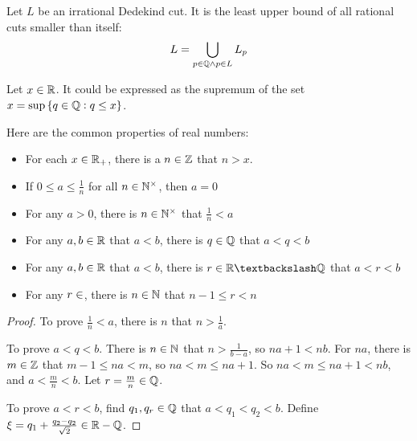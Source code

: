 \begin{theorem}
    Let $L$ be an irrational Dedekind cut. It is the least upper bound of all rational cuts smaller than itself:
    \begin{equation}
        L = \bigcup_{p \in \mathbb{Q} \wedge p \in L} L_p
    \end{equation}    
\end{theorem}


\begin{theorem}
Let $x \in \mathbb{R}$. It could be expressed as the supremum of the set $x = \sup \set{q \in \mathbb{Q}: q \leq x}$.
\end{theorem}



\begin{theorem}
    Here are the common properties of real numbers:
    \begin{itemize}
        \item For each $x \in \mathbb{R}_{+}$, there is a $n \in \mathbb{Z}$ that $n > x$.
        \item If $\displaystyle 0 \leq a \leq \frac{1}{n}$ for all $n \in \mathbb{N}^{\times}$, then $a = 0$
        \item For any $a >0$, there is $n \in \mathbb{N}^{\times}$ that $\displaystyle \frac{1}{n} < a$
        \item For any $a,b\in \mathbb{R}$ that $a < b$, there is $q \in \mathbb{Q}$ that $a < q < b$
        \item For any $a,b\in \mathbb{R}$ that $a < b$, there is $r \in \realnumber \textbackslash \rational $ that $a < r < b$
        \item For any $r \in \real$, there is $n \in \mathbb{N}$ that $n - 1 \leq r < n$
    \end{itemize}    
\end{theorem}
\begin{proof}
    To prove $\frac{1}{n} < a$, there is $n$ that $n > \frac{1}{a}$. 
    
    To prove $a < q < b$. There is $n \in \mathbb{N}$ that $n > \frac{1}{b-a}$, so $na + 1 < nb$. For $na$, there is $m \in \mathbb{Z}$ that $m - 1 \leq na < m$, so $na < m \leq na + 1$. So $na < m \leq na + 1 < nb$, and $a < \frac{m}{n} < b$. Let $r = \frac{m}{n} \in \mathbb{Q}$.
    
    To prove $a < r < b$, find $q_1, q_r \in \mathbb{Q}$ that $a < q_1 < q_2 < b$. Define $\xi = q_1 + \frac{q_2 - q_2}{\sqrt{2}} \in \mathbb{R} - \mathbb{Q}$.
\end{proof}



